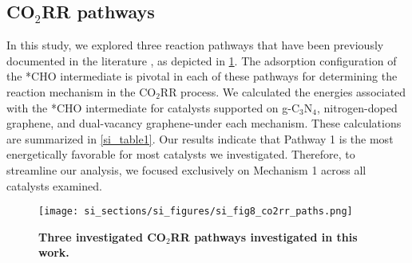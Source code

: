 \subsection{CO$_2$RR pathways}
In this study, we explored three reaction pathways that have been previously documented in the literature \cite{durand2011structure, nie2014reaction, peterson2010copper}, as depicted in \cref{si_fig8:co2rr_paths}.
The adsorption configuration of the *CHO intermediate is pivotal in each of these pathways for determining the reaction mechanism in the CO$_2$RR process.
We calculated the energies associated with the *CHO intermediate for catalysts
supported on g-C$_3$N$_4$, nitrogen-doped graphene, and dual-vacancy graphene-under each mechanism.
These calculations are summarized in \cref{si_table1}.  %
Our results indicate that Pathway 1 is the most energetically favorable for most catalysts we investigated.
Therefore, to streamline our analysis, we focused exclusively on Mechanism 1 across all catalysts examined.


\begin{figure}
  \centering
  \texttt{[image: si\_sections/si\_figures/si\_fig8\_co2rr\_paths.png]}
  \caption{\textbf{Three investigated CO$_2$RR pathways \cite{durand2011structure, nie2014reaction, peterson2010copper} investigated in this work.}}
  \label{si_fig8:co2rr_paths}
\end{figure}


